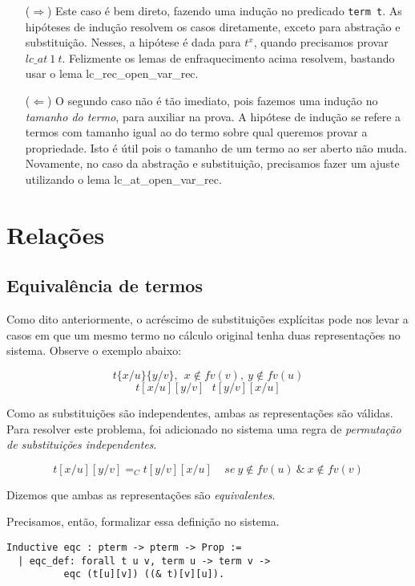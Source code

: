 \begin{itemize}
    \item[($\Rightarrow$)] Este caso é bem direto, fazendo uma indução no
        predicado \texttt{term t}. As hipóteses de indução resolvem os casos
        diretamente, exceto para abstração e substituição. Nesses, a hipótese é
        dada para $t^x$, quando precisamos provar $lc\_at\ 1\ t$. Felizmente os
        lemas de enfraquecimento acima resolvem, bastando usar o lema
        lc\_rec\_open\_var\_rec.
    \item[($\Leftarrow$)] O segundo caso não é tão imediato, pois fazemos uma
        indução no \emph{tamanho do termo}, para auxiliar na prova. A hipótese
        de indução se refere a termos com tamanho igual ao do termo sobre qual
        queremos provar a propriedade. Isto é útil pois o tamanho de um termo ao
        ser aberto não muda. Novamente, no caso da abstração e substituição,
        precisamos fazer um ajuste utilizando o lema lc\_at\_open\_var\_rec.
\end{itemize}

\section{Relações}
\label{sec:rela_es}

\subsection{Equivalência de termos}
\label{sub:equival_ncia_de_termos}

Como dito anteriormente, o acréscimo de substituições explícitas pode nos levar
a casos em que um mesmo termo no cálculo original tenha duas representações no
sistema. Observe o exemplo abaixo:

\[ t\{x/u\}\{y/v\},\ \ x \notin fv(v),\ y \notin fv(u) \]
\[ t[x/u][y/v]\ \ \ t[y/v][x/u]\]

Como as substituições são independentes, ambas as representações são válidas.
Para resolver este problema, foi adicionado no sistema uma regra de
\emph{permutação de substituições independentes}.

\[ t[x/u][y/v] =_C t[y/v][x/u] \ \ \ \ \ se\ y \notin fv(u)\ \&\ x \notin fv(v)\] 

Dizemos que ambas as representações são \emph{equivalentes}.

Precisamos, então, formalizar essa definição no sistema.

\begin{lstlisting}[basicstyle=\small]
Inductive eqc : pterm -> pterm -> Prop := 
  | eqc_def: forall t u v, term u -> term v -> 
          eqc (t[u][v]) ((& t)[v][u]).
\end{lstlisting}

